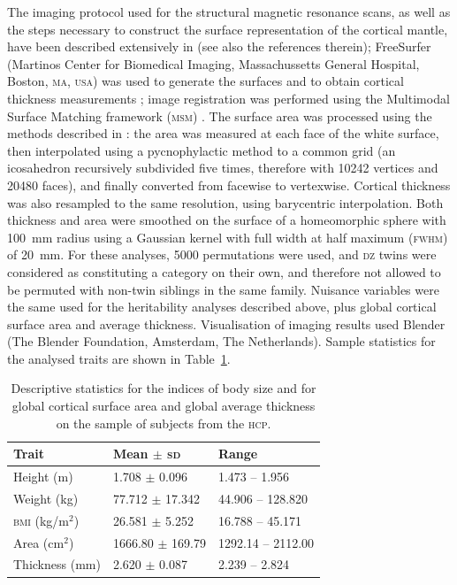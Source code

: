 The imaging protocol used for the structural magnetic resonance scans, as well as the steps necessary to construct the surface representation of the cortical mantle, have been described extensively in \citet{Glasser2013} (see also the references therein); FreeSurfer (Martinos Center for Biomedical Imaging, Massachussetts General Hospital, Boston, \textsc{ma}, \textsc{usa}) was used to generate the surfaces and to obtain cortical thickness measurements \citep{Dale1999, Fischl1999, Fischl2000}; image registration was performed using the Multimodal Surface Matching framework (\textsc{msm}) \citep{Robinson2014}. The surface area was processed using the methods described in \citet[see also Section \ref{sec:cortex:interpolation}]{Winkler2012}: the area was measured at each face of the white surface, then interpolated using a pycnophylactic method to a common grid (an icosahedron recursively subdivided five times, therefore with 10242 vertices and 20480 faces), and finally converted from facewise to vertexwise. Cortical thickness was also resampled to the same resolution, using barycentric interpolation. Both thickness and area were smoothed on the surface of a homeomorphic sphere with 100~mm radius using a Gaussian kernel with full width at half maximum (\textsc{fwhm}) of 20~mm. For these analyses, 5000 permutations were used, and \textsc{dz} twins were considered as constituting a category on their own, and therefore not allowed to be permuted with non-twin siblings in the same family. Nuisance variables were the same used for the heritability analyses described above, plus global cortical surface area and average thickness. Visualisation of imaging results used Blender (The Blender Foundation, Amsterdam, The Netherlands). Sample statistics for the analysed traits are shown in Table~\ref{tab:samplestats}.

\begin{table}[!tp]
\caption[Descriptive statistics for the relevant measurements from the \textsc{hcp} subjects.]{Descriptive statistics for the indices of body size and for global cortical surface area and global average thickness on the sample of subjects from the \textsc{hcp}.}
{\small
\begin{center}
\begin{tabular}{@{}lll@{}}
\toprule
Trait & Mean $\pm$ \textsc{sd} & Range\\
\midrule
Height (m) & 1.708 $\pm$ 0.096 & 1.473 -- 1.956\\
Weight (kg) & 77.712 $\pm$ 17.342 & 44.906 -- 128.820\\
\textsc{bmi} (kg/m$^2$) & 26.581 $\pm$ 5.252 & 16.788 -- 45.171\\
Area (cm$^2$) & 1666.80 $\pm$ 169.79 & 1292.14 -- 2112.00\\
Thickness (mm) & 2.620 $\pm$ 0.087 & 2.239 -- 2.824\\
\bottomrule   
\end{tabular}
\end{center}}
\label{tab:samplestats}
\end{table}


